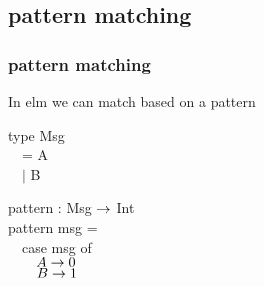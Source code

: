 \subsection{pattern matching}
    \begin{frame}
        \frametitle{pattern matching}
        In elm we can match based on a pattern 
        \begin{codeexample}
            type Msg\\
                $\quad$= A\\
                $\quad\vert$ B \\
        \end{codeexample}
        \begin{codeexample}
            pattern : Msg $\rightarrow$ Int\\
            pattern msg =\\
                $\quad$case msg of\\
                $\quad\quad A\rightarrow 0$\\
                $\quad\quad B \rightarrow 1$\\
        \end{codeexample}
    \end{frame}